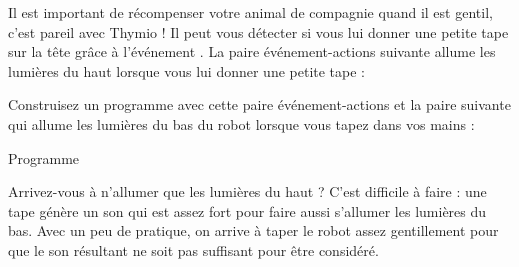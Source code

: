 
\bigskip


\newpage


Il est important de récompenser votre animal de compagnie quand il est gentil, c'est pareil avec Thymio !
Il peut vous détecter si vous lui donner une petite tape sur la tête grâce à l'événement .
La paire événement-actions suivante allume les lumières du haut lorsque vous lui donner une petite tape :

Construisez un programme avec cette paire événement-actions
et la paire suivante qui allume les lumières du bas du robot
lorsque vous tapez dans vos mains : 

{\raggedleft \hfill Programme }

Arrivez-vous à n'allumer que les lumières du haut ?
C'est difficile à faire : une tape génère un son qui est assez fort pour faire aussi s'allumer les lumières du bas.
Avec un peu de pratique, on arrive à taper le robot assez gentillement pour que le son résultant ne soit pas suffisant pour être considéré.

\bigskip

